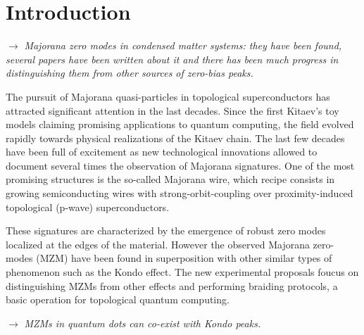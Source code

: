\documentclass[showpacs,aps,prb,reprint,superscriptaddress]{revtex4-1}
\newcommand{\TS}[1]{{$\rightarrow$ {\sl#1}}}
\begin{document}

\maketitle


\section{Introduction}
\label{sec:Intro}

\TS{Majorana zero modes in condensed matter systems: they have been found, several papers have been written about it and there has been much progress in distinguishing them from other sources of zero-bias peaks.}

The pursuit of Majorana quasi-particles in topological superconductors has attracted significant attention in the last decades.\cite{alicea_new_2012,beenakker_search_2013}  Since the first Kitaev's toy models \cite{kitaev_unpaired_2001,kitaev_fault-tolerant_2003} claiming promising applications to quantum computing, the field evolved rapidly towards physical realizations of the Kitaev chain.  The last few decades have been full of excitement as new technological innovations  allowed to document several times the observation of Majorana signatures. \citep{mourik_signatures_2012,das_zero-bias_2012,deng_anomalous_2012,nadj-perge_observation_2014,deng_majorana_2016,zhang_quantized_2018}  One of the most promising structures is the so-called Majorana wire, which recipe consists in growing semiconducting wires with strong-orbit-coupling over proximity-induced topological (p-wave) superconductors.  

These signatures are characterized by the emergence of robust zero modes localized at the edges of the material. However the observed Majorana zero-modes (MZM) have been found in superposition with other similar types of phenomenon such as the Kondo effect. \cite{lee_zero-bias_2012} The new experimental proposals foucus on distinguishing MZMs from other effects and performing braiding protocols,\cite{aasen_milestones_2016,sarma_majorana_2015,heck_coulomb-assisted_2012} a basic operation for topological quantum computing. 

\TS{MZMs in quantum dots can co-exist with Kondo peaks.}
\end{document}
